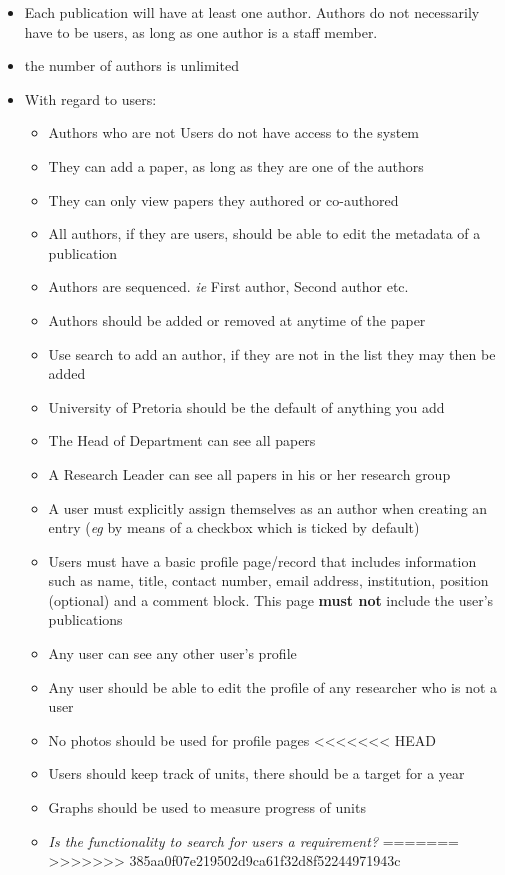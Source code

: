 \documentclass[a4paper,12pt]{article}
\begin{document}
\begin{itemize}
\item Each publication will have at least one author. Authors do not necessarily have to be users, as long as one author is a staff member.
\item the number of authors is unlimited
\item With regard to users:
\begin{itemize}
\item Authors who are not Users do not have access to the system
\item They can add a paper, as long as they are one of the authors
\item They can only view papers they authored or co-authored
\item All authors, if they are users, should be able to edit the metadata of a publication
\item Authors are sequenced. \textit{ie} First author, Second author etc.
\item Authors should be added or removed at anytime of the paper
\item Use search to add an author, if they are not in the list they may then be added 
\item University of Pretoria should be the default of anything you add 
\item The Head of Department can see all papers
\item A Research Leader can see all papers in his or her research group
\item A user must explicitly assign themselves as an author when creating an entry (\textit{eg} by means of a checkbox which is ticked by default)
\item Users must have a basic profile page/record that includes information such as name, 
title, contact number, email address, institution, position (optional) and a comment block. This page \textbf{must not} include the user's publications
\item Any user can see any other user's profile
\item Any user should be able to edit the profile of any researcher who is not a user
\item No photos should be used for profile pages
<<<<<<< HEAD
\item Users should keep track of units, there should be a target for a year
\item Graphs should be used to measure progress of units
\item \textit{Is the functionality to search for users a requirement?}
=======
>>>>>>> 385aa0f07e219502d9ca61f32d8f52244971943c
\end{itemize}


\end{itemize}
\end{document}
